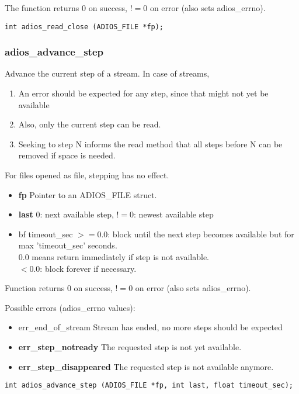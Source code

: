 The function returns 0 on success, $!=0$ on error (also sets adios\_errno).

\begin{lstlisting}[language=ADIOS]
int adios_read_close (ADIOS_FILE *fp);

\end{lstlisting}

\subsubsection*{adios\_advance\_step}
Advance the current step of a stream.
In case of streams, 
\begin{enumerate}
\item An error should be expected for any step, 
since that might not yet be available 
\item Also, only the current step can be read.
\item Seeking to step N informs the read method that all steps 
before N can be removed if space is needed.
\end{enumerate}
For files opened as file, stepping has no effect.

\begin{itemize}
\item{\bf fp}       Pointer to an ADIOS\_FILE struct.
\item{\bf last}     $0$: next available step, $!=0$: newest available step 
 \item{bf timeout\_sec}  $>=0.0$: block until the next step becomes available but 
for max 'timeout\_sec' seconds.\\
$0.0$ means return immediately if step is not available.\\
$<0.0$: block forever if necessary.
\end{itemize}

Function returns 0 on success, $!=0$ on error (also sets adios\_errno).

Possible errors (adios\_errno values):
\begin{itemize}
\item{err\_end\_of\_stream}    Stream has ended, no more steps should be expected
\item{\bf err\_step\_notready}    The requested step is not yet available.
\item{\bf err\_step\_disappeared} The requested step is not available anymore.
\end{itemize}

\begin{lstlisting}[language=ADIOS]
int adios_advance_step (ADIOS_FILE *fp, int last, float timeout_sec); 
\end{lstlisting}

